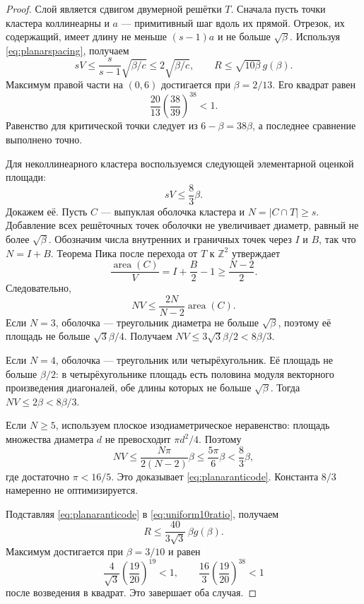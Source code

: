 \documentclass[11pt,a4paper]{article}
\theoremstyle{remark}\newtheorem{remark}[theorem]{Замечание}
\newcommand{\Z}{\mathbb Z}\newcommand{\R}{\mathbb R}\newcommand{\F}{\mathbb F}
\begin{document}
\begin{proof}
Слой является сдвигом двумерной решётки $T$. Сначала пусть точки кластера коллинеарны и $a$ --- примитивный шаг вдоль их прямой. Отрезок, их содержащий, имеет длину не меньше $(s-1)a$ и не больше $\sqrt\beta$. Используя \eqref{eq:planarspacing}, получаем
\[
sV\le\frac{s}{s-1}\sqrt{\beta/c}\le2\sqrt{\beta/c},
\qquad
R\le\sqrt{10\beta}\,g(\beta).
\]
Максимум правой части на $(0,6)$ достигается при $\beta=2/13$. Его квадрат равен
\[
\frac{20}{13}\left(\frac{38}{39}\right)^{38}<1.
\]
Равенство для критической точки следует из $6-\beta=38\beta$, а последнее сравнение выполнено точно.

Для неколлинеарного кластера воспользуемся следующей элементарной оценкой площади:
\begin{equation}\label{eq:planaranticode}
sV\le\frac83\beta.
\end{equation}
Докажем её. Пусть $C$ --- выпуклая оболочка кластера и $N=|C\cap T|\ge s$. Добавление всех решёточных точек оболочки не увеличивает диаметр, равный не более $\sqrt\beta$. Обозначим числа внутренних и граничных точек через $I$ и $B$, так что $N=I+B$. Теорема Пика после перехода от $T$ к $\Z^2$ утверждает
\[
\frac{\operatorname{area}(C)}V=I+\frac B2-1
\ge\frac{N-2}{2}.
\]
Следовательно,
\[
NV\le\frac{2N}{N-2}\operatorname{area}(C).
\]
Если $N=3$, оболочка --- треугольник диаметра не больше $\sqrt\beta$, поэтому её площадь не больше $\sqrt3\beta/4$. Получаем $NV\le3\sqrt3\beta/2<8\beta/3$.

Если $N=4$, оболочка --- треугольник или четырёхугольник. Её площадь не больше $\beta/2$: в четырёхугольнике площадь есть половина модуля векторного произведения диагоналей, обе длины которых не больше $\sqrt\beta$. Тогда $NV\le2\beta<8\beta/3$.

Если $N\ge5$, используем плоское изодиаметрическое неравенство: площадь множества диаметра $d$ не превосходит $\pi d^2/4$. Поэтому
\[
NV\le\frac{N\pi}{2(N-2)}\beta
\le\frac{5\pi}{6}\beta<\frac83\beta,
\]
где достаточно $\pi<16/5$. Это доказывает \eqref{eq:planaranticode}. Константа $8/3$ намеренно не оптимизируется.

Подставляя \eqref{eq:planaranticode} в \eqref{eq:uniform10ratio}, получаем
\[
R\le\frac{40}{3\sqrt3}\,\beta g(\beta).
\]
Максимум достигается при $\beta=3/10$ и равен
\[
\frac4{\sqrt3}\left(\frac{19}{20}\right)^{19}<1,
\qquad
\frac{16}{3}\left(\frac{19}{20}\right)^{38}<1
\]
после возведения в квадрат. Это завершает оба случая.
\end{proof}
\end{document}
